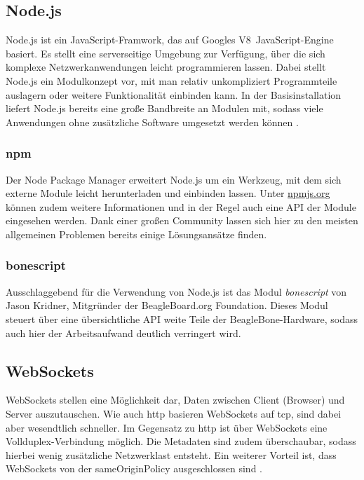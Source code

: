 \subsection{Node.js}
\label{subsec:Node.js}
Node.js ist ein JavaScript-Framwork, das auf Googles \glqq V8\grqq ~JavaScript-Engine basiert. Es stellt eine serverseitige Umgebung zur Verfügung, über die sich komplexe Netzwerkanwendungen leicht programmieren lassen. Dabei stellt Node.js ein Modulkonzept vor, mit man relativ unkompliziert Programmteile auslagern oder weitere Funktionalität einbinden kann. In der Basisinstallation liefert Node.js bereits eine große Bandbreite an Modulen mit, sodass viele Anwendungen ohne zusätzliche Software umgesetzt werden können \cite{springer2013}.

\subsubsection{npm}
Der Node Package Manager erweitert Node.js um ein Werkzeug, mit dem sich externe Module leicht herunterladen und einbinden lassen. Unter \href{https://www.npmjs.org/}{npmjs.org} können zudem weitere Informationen und in der Regel auch eine API der Module eingesehen werden. Dank einer großen Community lassen sich hier zu den meisten allgemeinen Problemen bereits einige Lösungsansätze finden.

\subsubsection{bonescript}
Ausschlaggebend für die Verwendung von Node.js ist das Modul \textit{bonescript} von Jason Kridner, Mitgründer der BeagleBoard.org  Foundation. Dieses Modul steuert über eine übersichtliche API weite Teile der BeagleBone-Hardware, sodass auch hier der Arbeitsaufwand deutlich verringert wird.

\subsection{WebSockets}
WebSockets stellen eine Möglichkeit dar, Daten zwischen Client (Browser) und Server auszutauschen. Wie auch \gls{http} basieren WebSockets auf \gls{tcp}, sind dabei aber wesendtlich schneller. Im Gegensatz zu \gls{http} ist über WebSockets eine Vollduplex-Verbindung möglich. Die Metadaten sind zudem überschaubar, sodass hierbei wenig zusätzliche Netzwerklast entsteht. Ein weiterer Vorteil ist, dass WebSockets von der \gls{sameOriginPolicy} ausgeschlossen sind \cite{rfc6455}.